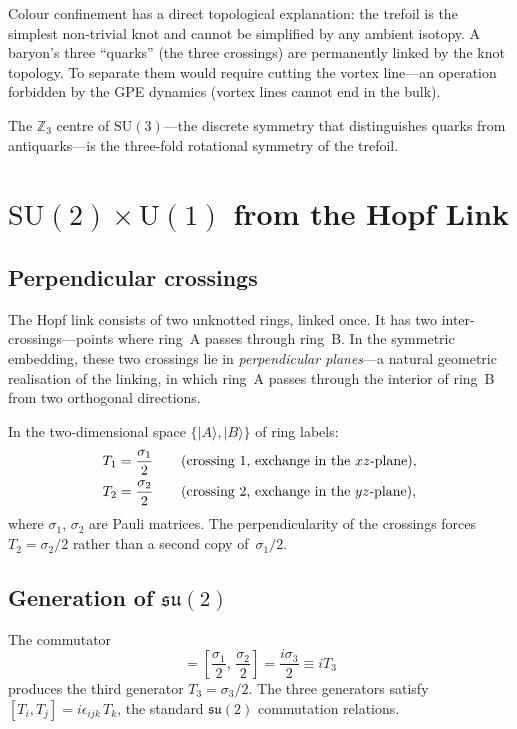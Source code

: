 \documentclass[11pt,a4paper]{article}
\begin{document}
Colour confinement has a direct topological explanation: the
trefoil is the simplest non-trivial knot and cannot be
simplified by any ambient isotopy.  A baryon's three ``quarks''
(the three crossings) are permanently linked by the knot
topology.  To separate them would require cutting the vortex
line---an operation forbidden by the GPE dynamics (vortex lines
cannot end in the bulk).

The $\mathbb{Z}_3$ centre of $\mathrm{SU}(3)$---the discrete
symmetry that distinguishes quarks from antiquarks---is the
three-fold rotational symmetry of the trefoil.


\section{$\mathrm{SU}(2) \times \mathrm{U}(1)$ from the Hopf Link}
\label{sec:su2u1}

\subsection{Perpendicular crossings}

The Hopf link consists of two unknotted rings, linked once.  It
has two inter-crossings---points where ring~A passes through
ring~B.  In the symmetric embedding, these two crossings lie in
\emph{perpendicular planes}---a natural geometric
realisation of the linking, in which ring~A passes through
the interior of ring~B from two orthogonal directions.

In the two-dimensional space $\{|A\rangle, |B\rangle\}$ of ring
labels:
\begin{align}
  T_1 &= \frac{\sigma_1}{2}
    \qquad\text{(crossing 1, exchange in the $xz$-plane)},
  \notag \\
  T_2 &= \frac{\sigma_2}{2}
    \qquad\text{(crossing 2, exchange in the $yz$-plane)},
  \label{eq:hopf_gens}
\end{align}
where $\sigma_1$, $\sigma_2$ are Pauli matrices.  The
perpendicularity of the crossings forces $T_2 = \sigma_2/2$
rather than a second copy of~$\sigma_1/2$.

\subsection{Generation of $\mathfrak{su}(2)$}

The commutator
\begin{equation}
  [T_1, T_2] = \left[\frac{\sigma_1}{2},\,
    \frac{\sigma_2}{2}\right]
    = \frac{i\sigma_3}{2} \equiv iT_3
  \label{eq:su2comm}
\end{equation}
produces the third generator $T_3 = \sigma_3/2$.  The three
generators satisfy $[T_i, T_j] = i\epsilon_{ijk}\,T_k$, the
standard $\mathfrak{su}(2)$ commutation relations.
\end{document}

